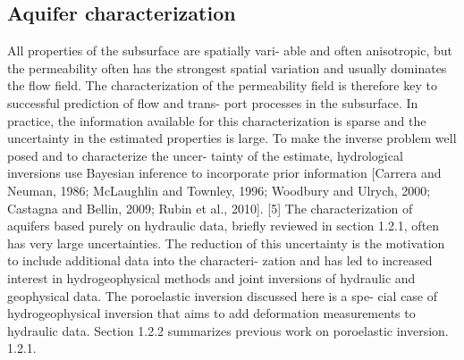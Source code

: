 \documentclass[11pt,final]{article}%
\begin{document}
\subsection{Aquifer characterization}\label{sec:aquifer characterization}
All properties of the subsurface are spatially vari-
able and often anisotropic, but the permeability often has the strongest spatial variation and usually dominates the flow field. The characterization of the permeability field is therefore key to successful prediction of flow and trans- port processes in the subsurface. In practice, the information available for this characterization is sparse and the uncertainty in the estimated properties is large. To make the inverse problem well posed and to characterize the uncer- tainty of the estimate, hydrological inversions use Bayesian inference to incorporate prior information [Carrera and Neuman, 1986; McLaughlin and Townley, 1996; Woodbury and Ulrych, 2000; Castagna and Bellin, 2009; Rubin et al., 2010]. [5] The characterization of aquifers based purely on hydraulic data, briefly reviewed in section 1.2.1, often has very large uncertainties. The reduction of this uncertainty is the motivation to include additional data into the characteri- zation and has led to increased interest in hydrogeophysical methods and joint inversions of hydraulic and geophysical data. The poroelastic inversion discussed here is a spe- cial case of hydrogeophysical inversion that aims to add deformation measurements to hydraulic data. Section 1.2.2 summarizes previous work on poroelastic inversion.
1.2.1.
\end{document}
